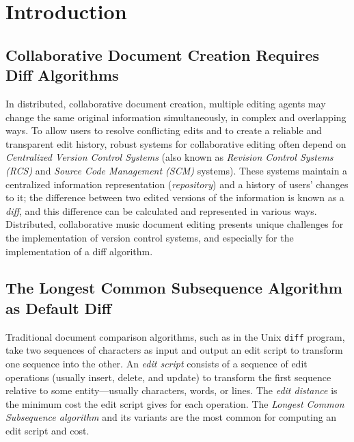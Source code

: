 \documentclass{article}
\title{\papertitle}
\begin{document}
%
\capstartfalse
\maketitle
\capstarttrue
%
\begin{abstract}
We describe an application of hierarchic diff to the collaborative
editing of tree-based music representations, using Zhang and Shasha's
tree edit distance algorithm as implemented within the XUDiff tool.
The edit distance between two trees is the minimum number of edit
operations necessary to transform one tree into the other.  We
consider common operations on the score tree---deleting, changing, and
appending tree nodes---to derive a minimal edit sequence, known as an
edit script, and we compare the performance of the widely used Longest
Common Subsequence algorithm against our approach. We conclude by summarizing implications for the design of collaborative music document software systems.
\end{abstract}
%

\section{Introduction}\label{sec:introduction}
\subsection{Collaborative Document Creation Requires Diff Algorithms}
In distributed, collaborative document creation, multiple editing agents may change the same original information simultaneously, in complex and overlapping ways. To allow users to resolve conflicting edits and to create a reliable and transparent edit history, robust systems for collaborative editing often depend on \emph{Centralized Version Control Systems} (also known as \emph{Revision Control Systems (RCS)} and \emph{Source Code Management (SCM)} systems). These systems maintain a centralized information representation (\emph{repository}) and a history of users' changes to it; the difference between two edited versions of the information is known as a \emph{diff}, and this difference can be calculated and represented in various ways. Distributed, collaborative music document editing presents unique challenges for the implementation of version control systems, and especially for the implementation of a diff algorithm.

\subsection{The Longest Common Subsequence Algorithm as Default Diff}
Traditional document comparison algorithms, such as in the Unix
\texttt{diff} program, take two sequences of characters as input and
output an edit script to transform one sequence into the other.  An
\emph{edit script} consists of a sequence of edit operations (usually
insert, delete, and update) to transform the first sequence relative
to some entity---usually characters, words, or lines.  The \emph{edit
  distance} is the minimum cost the edit script gives for each
operation.  The \emph{Longest Common Subsequence algorithm} and its variants
are the most common for computing an edit script and cost.
\end{document}
